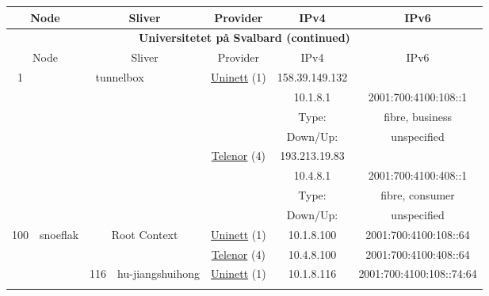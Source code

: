 \begin{small}
\begin{center}
\begin{longtable}{|c|c|c|c|c|c|c|c|}
 \multicolumn{2}{|p{8em}|}{Node} & \multicolumn{2}{|p{8em}|}{Sliver} & \multicolumn{2}{|p{8em}|}{Provider} & IPv4 & IPv6 \\ \hline
\endfirsthead
\hline
 \multicolumn{8}{|c|}{\textbf{Universitetet på Svalbard (continued)}} \\ \hline
 \multicolumn{2}{|p{8em}|}{Node} & \multicolumn{2}{|p{8em}|}{Sliver} & \multicolumn{2}{|p{8em}|}{Provider} & IPv4 & IPv6 \\ \hline
\endhead
 \multirow{8}{*}{\tiny{1}} & \multicolumn{3}{|c|}{\multirow{8}{*}{\tiny{tunnelbox}}} & \multicolumn{2}{|c|}{\multirow{4}{*}{\tiny{\href{https://www.uninett.no}{Uninett} (1)}}} & \tiny{158.39.149.132} & \frownie{} \\* \cline{7-7}\cline{8-8}
  & \multicolumn{3}{|c|}{} & \multicolumn{2}{|c|}{} & \tiny{10.1.8.1} & \tiny{2001:700:4100:108::1} \\* \cline{7-7}\cline{8-8}
  & \multicolumn{3}{|c|}{} & \multicolumn{2}{|c|}{} & Type: & fibre, business \\* \cline{7-7}\cline{8-8}
  & \multicolumn{3}{|c|}{} & \multicolumn{2}{|c|}{} & Down/Up:  & unspecified \\* \cline{5-5}\cline{6-6}\cline{7-7}\cline{8-8}
  & \multicolumn{3}{|c|}{} & \multicolumn{2}{|c|}{\multirow{4}{*}{\tiny{\href{https://www.telenor.no}{Telenor} (4)}}} & \tiny{193.213.19.83} & \frownie{} \\* \cline{7-7}\cline{8-8}
  & \multicolumn{3}{|c|}{} & \multicolumn{2}{|c|}{} & \tiny{10.4.8.1} & \tiny{2001:700:4100:408::1} \\* \cline{7-7}\cline{8-8}
  & \multicolumn{3}{|c|}{} & \multicolumn{2}{|c|}{} & Type: & fibre, consumer \\* \cline{7-7}\cline{8-8}
  & \multicolumn{3}{|c|}{} & \multicolumn{2}{|c|}{} & Down/Up:  & unspecified \\ \hline
 \multirow{26}{*}{\tiny{100}} & \multicolumn{1}{|l|}{\multirow{26}{*}{\tiny{snoeflak}}} & \multicolumn{2}{|c|}{\multirow{2}{*}{\tiny{Root Context}}} & \multicolumn{2}{|c|}{\tiny{\href{https://www.uninett.no}{Uninett} (1)}} & \tiny{10.1.8.100} & \tiny{2001:700:4100:108::64} \\* \cline{5-5}\cline{6-6}\cline{7-7}\cline{8-8}
  &  & \multicolumn{2}{|c|}{} & \multicolumn{2}{|c|}{\tiny{\href{https://www.telenor.no}{Telenor} (4)}} & \tiny{10.4.8.100} & \tiny{2001:700:4100:408::64} \\* \cline{3-3}\cline{4-4}\cline{5-5}\cline{6-6}\cline{7-7}\cline{8-8}
  &  & \multirow{2}{*}{\tiny{116}} & \multicolumn{1}{|l|}{\multirow{2}{*}{\tiny{hu-jiangshuihong}}} & \multicolumn{2}{|c|}{\tiny{\href{https://www.uninett.no}{Uninett} (1)}} & \tiny{10.1.8.116} & \tiny{2001:700:4100:108::74:64} \\* \cline{5-5}\cline{6-6}\cline{7-7}\cline{8-8}

\end{longtable}
\end{center}
\end{small}
